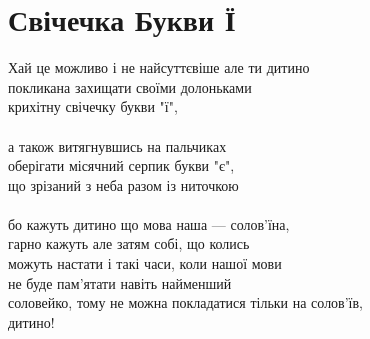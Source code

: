 \section{Свічечка Букви Ї}

Хай це можливо і не найсуттєвіше але ти дитино\\
покликана захищати своїми долоньками\\
крихітну свічечку букви "ї",
\\
\\
а також витягнувшись на пальчиках\\
оберігати місячний серпик букви "є",\\
що зрізаний з неба разом із ниточкою
\\
\\
бо кажуть дитино що мова наша — солов'їна,\\
гарно кажуть але затям собі, що колись\\
можуть настати і такі часи, коли нашої мови\\
не буде пам'ятати навіть найменший\\
соловейко, тому не можна покладатися тільки на солов'їв, \\
\indent дитино!

\normalsize
